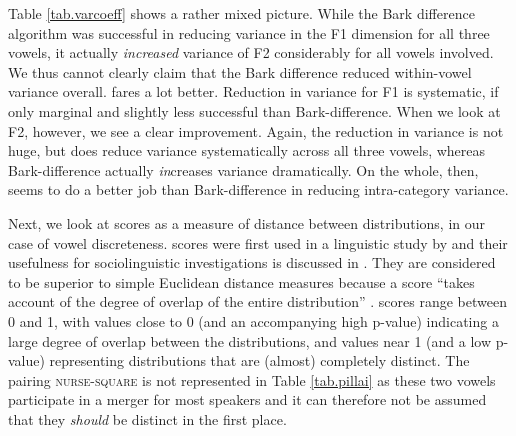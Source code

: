 Table \ref{tab.varcoeff} shows a rather mixed picture. While the Bark difference algorithm was successful in reducing variance in the F1 dimension for all three vowels, it actually \emph{increased} variance of F2 considerably for all vowels involved. We thus cannot clearly claim that the Bark difference  reduced within-vowel variance overall.
\citeauthor{wattfabricius2002} fares a lot better.
Reduction in variance for F1 is systematic, if only marginal and slightly less successful than Bark-difference.
When we look at F2, however, we see a clear improvement.
Again, the reduction in variance is not huge, but \citeauthor{wattfabricius2002} does reduce variance systematically across all three vowels, whereas Bark-difference actually \emph{in}creases variance dramatically.
On the whole, then, \citeauthor{wattfabricius2002} seems to do a better job than Bark-difference in reducing intra-category variance.

Next, we look at  scores as a measure of distance between distributions, in our case of vowel discreteness.
 scores were first used in a linguistic study by \textcite{hayetal2006b} and their usefulness for sociolinguistic investigations is discussed in \citealt{halllew2010}.
They are considered to be superior to simple Euclidean distance measures because a  score ``takes account of the degree of overlap of the entire distribution'' \parencite[467]{hayetal2006b}.
 scores range between 0 and 1, with values close to 0 (and an accompanying high p-value) indicating a large degree of overlap between the distributions, and values near 1 (and a low p-value) representing distributions that are (almost) completely distinct.
The pairing \textsc{nurse-square} is not represented in Table \ref{tab.pillai} as these two vowels participate in a merger for most speakers and it can therefore not be assumed that they \emph{should} be distinct in the first place.

